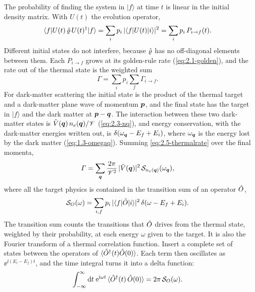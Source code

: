 The probability of finding the system in $|f\rangle$ at time $t$ is linear in the initial density matrix. With $U(t)$ the evolution operator,
\begin{equation*}
  \langle f|U(t)\,\hat{\varrho}\,U(t)^\dagger|f\rangle = \sum_ip_i\,|\langle f|U(t)|i\rangle|^2 = \sum_ip_i\,P_{i\to f}(t) .
\end{equation*}
Different initial states do not interfere, because $\hat{\varrho}$ has no off-diagonal elements between them. Each $P_{i\to f}$ grows at its golden-rule rate (\cref{eq:2.1-golden}), and the rate out of the thermal state is the weighted sum
\begin{equation}
  \varGamma = \sum_ip_i\sum_f\varGamma_{i\to f} .
  \label{eq:2.5-thermalrate}
\end{equation}
For dark-matter scattering the initial state is the product of the thermal target and a dark-matter plane wave of momentum $\bm{p}$, and the final state has the target in $|f\rangle$ and the dark matter at $\bm{p} - \bm{q}$. The interaction between these two dark-matter states is $\tilde V(\bm{q})\,n_e(\bm{q})/\mathscr{V}$ (\cref{eq:2.3-nq}), and energy conservation, with the dark-matter energies written out, is $\delta(\omega_{\bm{q}} - E_f + E_i)$, where $\omega_{\bm{q}}$ is the energy lost by the dark matter (\cref{eq:1.3-omegaq}). Summing \cref{eq:2.5-thermalrate} over the final momenta,
\begin{equation*}
  \varGamma = \sum_{\bm{q}}\frac{2\pi}{\mathscr{V}^2}\,|\tilde V(\bm{q})|^2\,\mathcal{S}_{n_e(\bm{q})}(\omega_{\bm{q}}),
\end{equation*}
where all the target physics is contained in the transition sum of an operator $\hat{O}$,
\begin{equation}
  \mathcal{S}_O(\omega) = \sum_{i,f}p_i\,|\langle f|\hat{O}|i\rangle|^2\,\delta(\omega - E_f + E_i) .
  \label{eq:2.5-transum}
\end{equation}
The transition sum counts the transitions that $\hat{O}$ drives from the thermal state, weighted by their probability, at each energy $\omega$ given to the target. It is also the Fourier transform of a thermal correlation function. Insert a complete set of states between the operators of $\langle\hat{O}^\dagger(t)\hat{O}(0)\rangle$. Each term then oscillates as $\ee^{\ii(E_i - E_f)t}$, and the time integral turns it into a delta function:
\begin{equation}
  \int_{-\infty}^{\infty}\mathrm{d} t\;\mathrm{e}^{\mathrm{i}\omega t}\,\langle\hat{O}^\dagger(t)\,\hat{O}(0)\rangle = 2\pi\,\mathcal{S}_O(\omega) .
  \label{eq:2.5-corr}
\end{equation}
